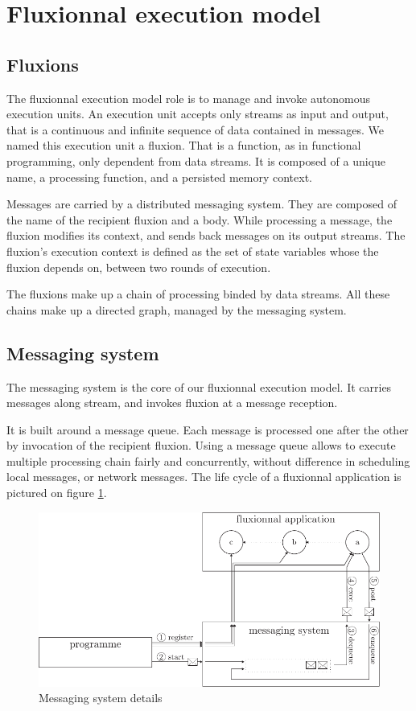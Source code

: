 \section{Fluxionnal execution model} \label{section:model}

\subsection{Fluxions}

The fluxionnal execution model role is to manage and invoke autonomous execution units.
An execution unit accepts only streams as input and output, that is a continuous and infinite sequence of data contained in messages.
We named this execution unit a fluxion.
That is a function, as in functional programming, only dependent from data streams.
It is composed of a unique name, a processing function, and a persisted memory context.

Messages are carried by a distributed messaging system.
They are composed of the name of the recipient fluxion and a body.
While processing a message, the fluxion modifies its context, and sends back messages on its output streams.
The fluxion's execution context is defined as the set of state variables whose the fluxion depends on, between two rounds of execution.

The fluxions make up a chain of processing binded by data streams.
All these chains make up a directed graph, managed by the messaging system.

\subsection{Messaging system}

The messaging system is the core of our fluxionnal execution model.
It carries messages along stream, and invokes fluxion at a message reception.

It is built around a message queue.
Each message is processed one after the other by invocation of the recipient fluxion.
Using a message queue allows to execute multiple processing chain fairly and concurrently, without difference in scheduling local messages, or network messages.
The life cycle of a fluxionnal application is pictured on figure \ref{fig:MesSys}.

\begin{figure}[h!]
  \includegraphics[width=\linewidth]{ressources/schema-message.pdf}
  \caption{Messaging system details}
  \label{fig:MesSys}
\end{figure}

